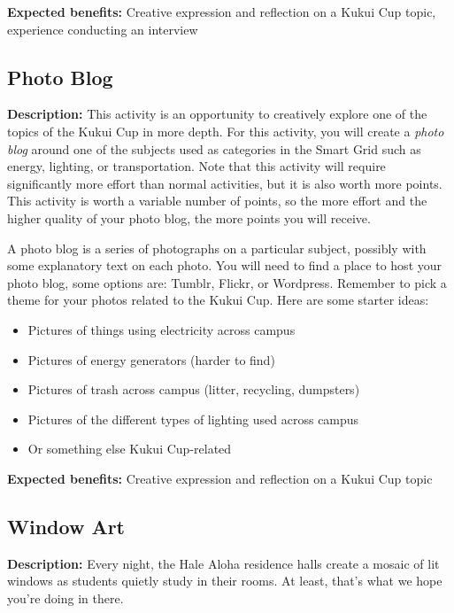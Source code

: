 \vspace{2ex}
\textbf{Expected benefits:} Creative expression and reflection on a Kukui Cup topic, experience conducting an interview


\subsection{Photo Blog}

\textbf{Description:} This activity is an opportunity to creatively explore one of the topics of the Kukui Cup in more depth. For this activity, you will create a \emph{photo blog} around one of the subjects used as categories in the Smart Grid such as energy, lighting, or transportation. Note that this activity will require significantly more effort than normal activities, but it is also worth more points. This activity is worth a variable number of points, so the more effort and the higher quality of your photo blog, the more points you will receive.

A photo blog is a series of photographs on a particular subject, possibly with some explanatory text on each photo. You will need to find a place to host your photo blog, some options are: Tumblr, Flickr, or Wordpress. Remember to pick a theme for your photos related to the Kukui Cup. Here are some starter ideas:

\begin{itemize}
	\item Pictures of things using electricity across campus
	\item Pictures of energy generators (harder to find)
	\item Pictures of trash across campus (litter, recycling, dumpsters)
	\item Pictures of the different types of lighting used across campus
	\item Or something else Kukui Cup-related
\end{itemize}

\vspace{2ex}
\textbf{Expected benefits:} Creative expression and reflection on a Kukui Cup topic


\subsection{Window Art}

\textbf{Description:} Every night, the Hale Aloha residence halls create a mosaic of lit windows as students quietly study in their rooms. At least, that's what we hope you're doing in there.

